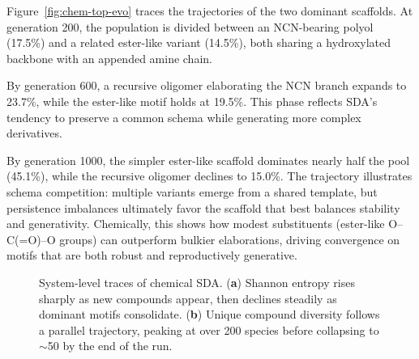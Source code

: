 \documentclass[life,article,submit,pdftex,moreauthors]{Definitions/mdpi}
\begin{document}
Figure~\ref{fig:chem-top-evo} traces the trajectories of the two dominant scaffolds.  
At generation 200, the population is divided between an NCN-bearing polyol (17.5\%) and a related ester-like variant (14.5\%), both sharing a hydroxylated backbone with an appended amine chain.  

By generation 600, a recursive oligomer elaborating the NCN branch expands to 23.7\%, while the ester-like motif holds at 19.5\%. This phase reflects SDA’s tendency to preserve a common schema while generating more complex derivatives.  

By generation 1000, the simpler ester-like scaffold dominates nearly half the pool (45.1\%), while the recursive oligomer declines to 15.0\%. The trajectory illustrates schema competition: multiple variants emerge from a shared template, but persistence imbalances ultimately favor the scaffold that best balances stability and generativity. Chemically, this shows how modest substituents (ester-like O–C(=O)–O groups) can outperform bulkier elaborations, driving convergence on motifs that are both robust and reproductively generative.


\begin{figure}[H]
\centering
{}
\hfill
{}
\caption{System-level traces of chemical SDA. (\textbf{a}) Shannon entropy rises sharply as new compounds appear, then declines steadily as dominant motifs consolidate. (\textbf{b}) Unique compound diversity follows a parallel trajectory, peaking at over 200 species before collapsing to $\sim$50 by the end of the run.}
\label{fig:chem-entropy-diversity}
\end{figure}
\end{document}
